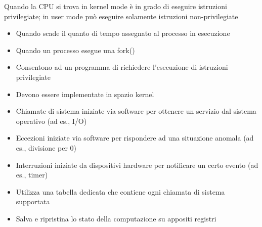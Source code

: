 \documentclass{article}
\begin{document}
\begin{tcolorbox}[colback=green!5!white,colframe=green!75!black,title=Qual è la differenza tra kernel e user mode?]
Quando la CPU si trova in kernel mode è in grado di eseguire istruzioni privilegiate; in user mode può eseguire solamente istruzioni non-privilegiate
\end{tcolorbox}

\begin{tcolorbox}[colback=green!5!white,colframe=green!75!black,title=La transizione da user a kernel mode avviene:]
\begin{itemize}
    \item Quando scade il quanto di tempo assegnato al processo in esecuzione
    \item Quando un processo esegue una fork()
\end{itemize}
\end{tcolorbox}

\begin{tcolorbox}[colback=green!5!white,colframe=green!75!black,title=Le chiamate di sistema:]
\begin{itemize}
    \item Consentono ad un programma di richiedere l'esecuzione di istruzioni privilegiate
    \item Devono essere implementate in spazio kernel
\end{itemize}
\end{tcolorbox}

\begin{tcolorbox}[colback=green!5!white,colframe=green!75!black,title=Differenza tra:]
\begin{itemize}
    \item Chiamate di sistema iniziate via software per ottenere un servizio dal sistema operativo (ad es., I/O)
    \item Eccezioni iniziate via software per rispondere ad una situazione anomala (ad es., divisione per 0)
    \item Interruzioni iniziate da dispositivi hardware per notificare un certo evento (ad es., timer)
\end{itemize}
\end{tcolorbox}

\begin{tcolorbox}[colback=green!5!white,colframe=green!75!black,title=Il System Call Handler:]
\begin{itemize}
    \item Utilizza una tabella dedicata che contiene ogni chiamata di sistema supportata
    \item Salva e ripristina lo stato della computazione su appositi registri
\end{itemize}
\end{tcolorbox}
\end{document}
